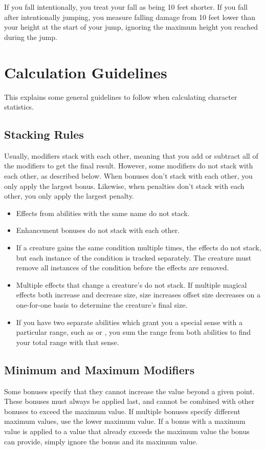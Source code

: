     If you fall intentionally, you treat your fall as being 10 feet shorter.
    If you fall after intentionally jumping, you measure falling damage from 10 feet lower than your height at the start of your jump, ignoring the maximum height you reached during the jump.

\section{Calculation Guidelines}
  This explains some general guidelines to follow when calculating character statistics.

  \subsection{Stacking Rules}\label{Stacking Rules}
    Usually, modifiers stack with each other, meaning that you add or subtract all of the modifiers to get the final result.
    However, some modifiers do not stack with each other, as described below.
    When bonuses don't stack with each other, you only apply the largest bonus.
    Likewise, when penalties don't stack with each other, you only apply the largest penalty.

    \begin{itemize}
      \item Effects from abilities with the same name do not stack.
      \item Enhancement bonuses do not stack with each other.
      \item If a creature gains the same condition multiple times, the effects do not stack, but each instance of the condition is tracked separately.
        The creature must remove all instances of the condition before the effects are removed.
      \item Multiple \magical effects that change a creature's  do not stack.
        If multiple magical effects both increase and decrease size, size increases offset size decreases on a one-for-one basis to determine the creature's final size.
      \item If you have two separate abilities which grant you a special sense with a particular range, such as  or , you sum the range from both abilities to find your total range with that sense.
    \end{itemize}

  \subsection{Minimum and Maximum Modifiers}\label{Minimum and Maximum Modifiers}
    Some bonuses specify that they cannot increase the value beyond a given point.
    These bonuses must always be applied last, and cannot be combined with other bonuses to exceed the maximum value.
    If multiple bonuses specify different maximum values, use the lower maximum value.
    If a bonus with a maximum value is applied to a value that already exceeds the maximum value the bonus can provide, simply ignore the bonus and its maximum value.

